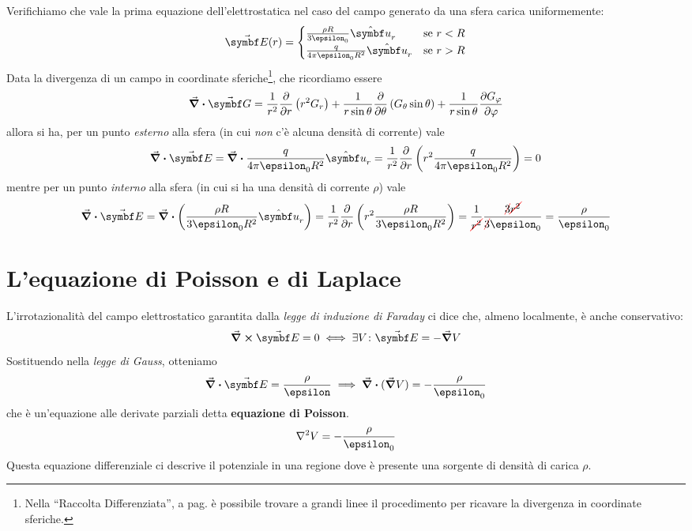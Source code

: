 \begin{examplewt}
	Verifichiamo che vale la prima equazione dell'elettrostatica nel caso del campo generato da una sfera carica uniformemente:
	\begin{equation*}
		\vba{E}(r)=\begin{cases}
			\frac{\rho R}{3\epsilon_0}\vbh{u}_r&\text{se}\ r< R\\
			\frac{q}{4\pi\epsilon_0 R^2}\vbh{u}_r &\text{se}\ r> R
		\end{cases}
	\end{equation*}
	Data la divergenza di un campo in coordinate sferiche\footnote{Nella ``Raccolta Differenziata'', a pag. \pageref{DivergenzaSferiche} è possibile trovare a grandi linee il procedimento per ricavare la divergenza in coordinate sferiche.}, che ricordiamo essere
	\begin{equation*}
		\div{\vba{G}}=\frac{1}{r^2}\pdv{r}\left(r^2G_r\right)+\frac{1}{r\sin\theta}\pdv{\theta}\left(G_\theta\sin\theta\right)+\frac{1}{r\sin\theta}\pdv{G_\phi}{\phi}
	\end{equation*}
	allora si ha, per un punto \textit{esterno} alla sfera (in cui \textit{non} c'è alcuna densità di corrente) vale
	\begin{equation}
		\divergence{\vba{E}}=\div{\frac{q}{4\pi\epsilon_0 R^2}\vbh{u}_r}=\frac{1}{r^2}\pdv{r}\left(r^2\frac{q}{4\pi\epsilon_0 R^2}\right)=0
	\end{equation}
	mentre per un punto \textit{interno} alla sfera (in cui si ha una densità di corrente $\rho$) vale
	\begin{equation*}
		\div{\vba{E}}=\div{\left(\frac{\rho R}{3\epsilon_0R^2}\vbh{u}_r\right)}=\frac{1}{r^2}\pdv{r}\left(r^2\frac{\rho R}{3\epsilon_0R^2}\right)=\frac{1}{\Ccancel[red]{r^2}}\frac{\Ccancel[red]{3}\Ccancel[red]{r^2}}{\Ccancel[red]{3}\epsilon_0}=\frac{\rho}{\epsilon_0}
	\end{equation*}
\end{examplewt}
\section{L'equazione di Poisson e di Laplace}\label{EqPoissonSezione}
L'irrotazionalità del campo elettrostatico garantita dalla \textit{legge di induzione di Faraday} ci dice che, almeno localmente, è anche conservativo:
\begin{equation*}
	\curl{\vba{E}}=0\iff \exists V\colon \vba{E}=-\grad{V}
\end{equation*}
Sostituendo nella \textit{legge di Gauss}, otteniamo
\begin{equation*}
	\div{\vba{E}}=\frac{\rho}{\epsilon}\implies\div{(\grad{V})}=-\frac{\rho}{\epsilon_0}
\end{equation*}
che è un'equazione alle derivate parziali detta \textbf{equazione di Poisson}.
\begin{equation}
	\laplacian{V}=-\frac{\rho}{\epsilon_0}
\end{equation}
Questa equazione differenziale ci descrive il potenziale in una regione dove è presente una sorgente di densità di carica $\rho$.

